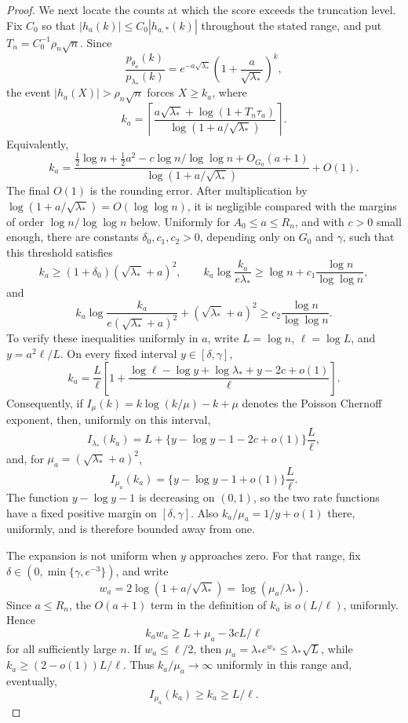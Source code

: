 \documentclass[11pt]{article}
\theoremstyle{definition}
\numberwithin{equation}{section}
\begin{document}
\begin{proof}
We next locate the counts at which the score exceeds the truncation level.
Fix \(C_0\) so that \(|h_a(k)|\le C_0|h_{a,*}(k)|\) throughout the stated
range, and put \(T_n=C_0^{-1}\rho_n\sqrt n\). Since
\[
 \frac{p_{\theta_a}(k)}{p_{\lambda_*}(k)}
 =e^{-a\sqrt{\lambda_*}}
  \left(1+\frac a{\sqrt{\lambda_*}}\right)^k,
\]
the event \(|h_a(X)|>\rho_n\sqrt n\) forces \(X\ge k_a\), where
\[
    k_a
    =
    \left\lceil
    \frac{
        a\sqrt{\lambda_*}+\log(1+T_n\tau_a)
    }
    {\log(1+a/\sqrt{\lambda_*})}
    \right\rceil .
\]
Equivalently,
\[
 k_a=
 \frac{
        \frac12\log n+\frac12a^2-c\log n/\log\log n+O_{G_0}(a+1)
      }
      {\log(1+a/\sqrt{\lambda_*})}
 +O(1).
\]
The final \(O(1)\) is the rounding error. After multiplication by
\(\log(1+a/\sqrt{\lambda_*})=O(\log\log n)\), it is negligible compared
with the margins of order \(\log n/\log\log n\) below.
Uniformly for \(A_0\le a\le R_n\), and with \(c>0\) small enough, there are constants \(\delta_0,c_1,c_2>0\), depending only on \(G_0\) and \(\gamma\), such that this threshold satisfies
\[
    k_a\ge(1+\delta_0)(\sqrt{\lambda_*}+a)^2,
    \qquad
    k_a\log\frac{k_a}{e\lambda_*}
    \ge
    \log n+c_1\frac{\log n}{\log\log n},
\]
and
\[
    k_a\log\frac{k_a}{e(\sqrt{\lambda_*}+a)^2}
    +(\sqrt{\lambda_*}+a)^2
    \ge
    c_2\frac{\log n}{\log\log n}.
\]
To verify these inequalities uniformly in \(a\), write
\(L=\log n\), \(\ell=\log L\), and
\(y=a^2\ell/L\). On every fixed interval \(y\in[\delta,\gamma]\),
\[
    k_a
    =
    \frac{L}{\ell}
    \left[
        1+
        \frac{\log\ell-\log y+\log\lambda_*+y-2c+o(1)}{\ell}
    \right].
\]
Consequently, if \(I_\mu(k)=k\log(k/\mu)-k+\mu\) denotes the Poisson
Chernoff exponent, then, uniformly on this interval,
\[
    I_{\lambda_*}(k_a)
    =
    L+
    \{y-\log y-1-2c+o(1)\}\frac{L}{\ell},
\]
and, for \(\mu_a=(\sqrt{\lambda_*}+a)^2\),
\[
    I_{\mu_a}(k_a)
    =
    \{y-\log y-1+o(1)\}\frac{L}{\ell}.
\]
The function \(y-\log y-1\) is decreasing on \((0,1)\), so the two rate
functions have a fixed positive margin on \([\delta,\gamma]\). Also
\(k_a/\mu_a=1/y+o(1)\) there, uniformly, and is therefore bounded away
from one.

The expansion is not uniform when \(y\) approaches zero. For that range, fix
\(\delta\in(0,\min\{\gamma,e^{-3}\})\), and write
\[
 w_a=2\log(1+a/\sqrt{\lambda_*})
     =\log(\mu_a/\lambda_*).
\]
Since \(a\le R_n\), the \(O(a+1)\) term in the definition of \(k_a\) is
\(o(L/\ell)\), uniformly. Hence
\begin{equation}
\label{eq:poisson-threshold-product}
 k_aw_a\ge L+\mu_a-3cL/\ell
\end{equation}
for all sufficiently large \(n\). If \(w_a\le\ell/2\), then
\(\mu_a=\lambda_*e^{w_a}\le\lambda_*\sqrt L\), while
\(k_a\ge(2-o(1))L/\ell\). Thus \(k_a/\mu_a\to\infty\) uniformly in this
range and, eventually,
\[
 I_{\mu_a}(k_a)\ge k_a\ge L/\ell.
\]


\end{proof}
\end{document}
